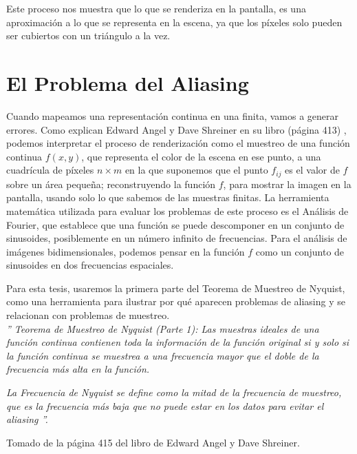 \documentclass[pregrado]{tesis-usb} %
\begin{document}
Este proceso nos muestra que lo que se renderiza en la pantalla, es una aproximación a lo que se representa en la escena, ya que los píxeles solo pueden ser cubiertos con un triángulo a la vez. \cite{Moller2007, Doggett2017EDAN35}


\section{El Problema del Aliasing}
Cuando mapeamos una representación continua en una finita, vamos a generar errores. Como explican Edward Angel y Dave Shreiner en su libro (página 413) \cite{Shreiner2011}, podemos interpretar el proceso de renderización como el muestreo de una función continua $f(x, y)$, que representa el color de la escena en ese punto, a una cuadrícula de píxeles $n\times m$ en la que suponemos que el punto $f_{ij}$ es el valor de $f$ sobre un área pequeña; reconstruyendo la función $f$, para mostrar la imagen en la pantalla, usando solo lo que sabemos de las muestras finitas. La herramienta matemática utilizada para evaluar los problemas de este proceso es el Análisis de Fourier, que establece que una función se puede descomponer en un conjunto de sinusoides, posiblemente en un número infinito de frecuencias. Para el análisis de imágenes bidimensionales, podemos pensar en la función $f$ como un conjunto de sinusoides en dos frecuencias espaciales.

Para esta tesis, usaremos la primera parte del Teorema de Muestreo de Nyquist, como una herramienta para ilustrar por qué aparecen problemas de aliasing y se relacionan con problemas de muestreo. \\

\emph{'' Teorema de Muestreo de Nyquist (Parte 1): Las muestras ideales de una función continua contienen toda la información de la función original si y solo si la función continua se muestrea a una frecuencia mayor que el doble de la frecuencia más alta en la función. }

\emph{La Frecuencia de Nyquist se define como la mitad de la frecuencia de muestreo, que es la frecuencia más baja que no puede estar en los datos para evitar el \textit{aliasing} ''.
} 


Tomado de la página 415 del libro de Edward Angel y Dave Shreiner. \cite{Shreiner2011} \\
\end{document}
